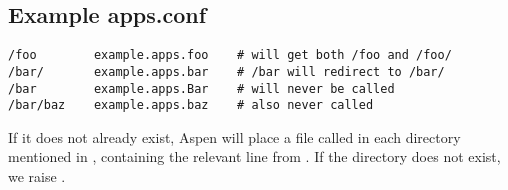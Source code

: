 \subsection{Example apps.conf \label{apps.conf}}

\begin{verbatim}
/foo        example.apps.foo    # will get both /foo and /foo/
/bar/       example.apps.bar    # /bar will redirect to /bar/
/bar        example.apps.Bar    # will never be called
/bar/baz    example.apps.baz    # also never called
\end{verbatim}

If it does not already exist, Aspen will place a file called 
in each directory mentioned in , containing the relevant line
from . If the directory does not exist, we raise
.
